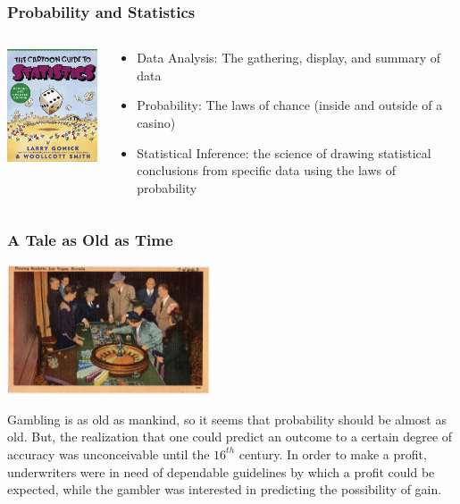 \documentclass{beamer}
\begin{document}
\begin{frame}\frametitle{Probability and Statistics}
\begin{columns}
\begin{column}{5cm}
\begin{center}
\includegraphics[width=5cm]{fig/cartoonguidestats.jpg}
\end{center}
\end{column}
\begin{column}{5cm}
\begin{itemize}
\item Data Analysis: The gathering, display, and summary of data
\item Probability: The laws of chance (inside and outside of a casino)
\item Statistical Inference: the science of drawing statistical conclusions from specific data using the laws of probability
\end{itemize}
\end{column}
\end{columns}
\end{frame}

\begin{frame}\frametitle{A Tale as Old as Time}
\begin{center}
\includegraphics[width=6cm]{fig/vegas.jpg}
\end{center}


Gambling is as old as mankind, so it seems that probability should be almost as old. But, the realization that one could predict an outcome to a certain degree of accuracy was unconceivable until the $16^{th}$ century. In order to make a profit, underwriters were in need of dependable guidelines by which a profit could be expected, while the gambler was interested in predicting the possibility of gain.
\end{frame}
\end{document}

